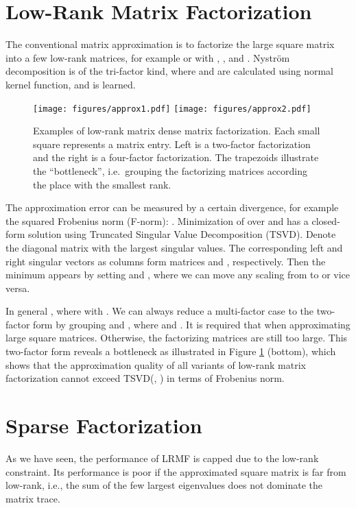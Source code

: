 \documentclass{article}
\begin{document}
\section{Low-Rank Matrix Factorization}
\label{sec:lowrank}
The conventional matrix approximation is to factorize the large square matrix  into a few low-rank matrices, for example  or  with , ,  and . Nystr\"{o}m decomposition \citep{nystrom1} is of the tri-factor kind, where  and  are calculated using normal kernel function, and  is learned.

\begin{figure}[t]
	\begin{center}
		\texttt{[image: figures/approx1.pdf]}\quad\quad\quad\quad
		\texttt{[image: figures/approx2.pdf]}
	\end{center}
	\caption{Examples of low-rank matrix dense matrix factorization. Each small square represents a matrix entry. Left is a two-factor factorization and the right is a four-factor factorization. The trapezoids illustrate the ``bottleneck'', i.e.~grouping the factorizing matrices according the place with the smallest rank.}
	\label{fig:lowrank}
\end{figure}


The approximation error can be measured by a certain divergence, for example the squared Frobenius norm (F-norm): .
Minimization of  over  and  has a closed-form solution using Truncated Singular Value Decomposition (TSVD). Denote  the diagonal matrix with the largest  singular values. The corresponding left and right singular vectors as columns form matrices  and , respectively. Then the minimum appears by setting  and , where we can move any scaling from  to  or vice versa.

In general , where  with . We can always reduce a multi-factor case to the two-factor form by grouping  and , where  and .
It is required that  when approximating large square matrices. Otherwise, the factorizing matrices are still too large. This two-factor form reveals a bottleneck as illustrated in Figure \ref{fig:lowrank} (bottom), which shows that the approximation quality of all variants of low-rank matrix factorization cannot exceed TSVD(, ) in terms of Frobenius norm.

\section{Sparse Factorization}
\label{sec:nonparametric}
As we have seen, the performance of LRMF is capped due to the low-rank constraint. Its performance is poor if the approximated square matrix is far from low-rank, i.e., the sum of the few largest eigenvalues does not dominate the matrix trace.
\end{document}
